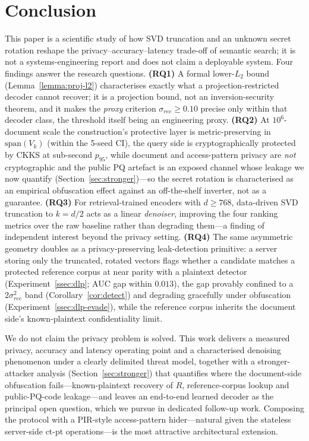 \documentclass[11pt,a4paper]{article}
\begin{document}
\section{Conclusion}\label{sec:conclusion}

This paper is a scientific study of how SVD truncation and an unknown
secret rotation reshape the privacy--accuracy--latency trade-off of
semantic search; it is not a systems-engineering report and does not
claim a deployable system. Four findings answer the research questions.
\textbf{(RQ1)} A formal lower-$L_2$ bound (Lemma~\ref{lemma:proj-l2})
characterises exactly what a projection-restricted decoder cannot
recover; it is a projection bound, not an inversion-security theorem,
and it makes the \emph{proxy} criterion $\sigma_{rec} \geq 0.10$ precise
only within that decoder class, the threshold itself being an
engineering proxy. \textbf{(RQ2)} At $10^6$-document scale the
construction's protective layer is metric-preserving in
$\mathrm{span}(V_k)$ (within the 5-seed CI), the query side is
cryptographically protected by CKKS at sub-second $p_{95}$, while
document and access-pattern privacy are \emph{not} cryptographic and
the public PQ artefact is an exposed channel whose leakage we now
quantify (Section~\ref{sec:stronger})---so the secret rotation is
characterised as an empirical obfuscation effect against an off-the-shelf
inverter, not as a guarantee. \textbf{(RQ3)} For
retrieval-trained encoders with $d \geq 768$, data-driven SVD truncation
to $k = d/2$ acts as a linear \emph{denoiser}, improving the four
ranking metrics over the raw baseline rather than degrading them---a
finding of independent interest beyond the privacy setting.
\textbf{(RQ4)} The same asymmetric geometry doubles as a
privacy-preserving leak-detection primitive: a server storing only the
truncated, rotated vectors flags whether a candidate matches a protected
reference corpus at near parity with a plaintext detector
(Experiment~\ref{ssec:dlp}; AUC gap within $0.013$), the gap provably
confined to a $2\sigma_{rec}^2$ band (Corollary~\ref{cor:detect}) and
degrading gracefully under obfuscation (Experiment~\ref{ssec:dlp-evade}),
while the reference corpus inherits the document side's known-plaintext
confidentiality limit.

We do not claim the privacy problem is solved. This work delivers a
measured privacy, accuracy and latency operating point and a characterised
denoising phenomenon under a clearly delimited threat model, together
with a stronger-attacker analysis (Section~\ref{sec:stronger}) that
quantifies where the document-side obfuscation fails---known-plaintext
recovery of $R$, reference-corpus lookup and public-PQ-code leakage---and
leaves an end-to-end learned decoder as the principal open question, which we pursue in dedicated follow-up work.
Composing the protocol with a PIR-style access-pattern hider---natural
given the stateless server-side ct-pt operations---is the most attractive
architectural extension.
\end{document}
